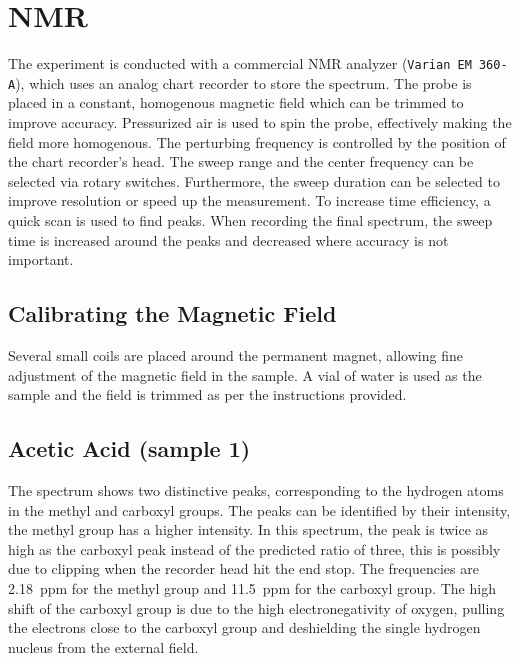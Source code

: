 \chapter{NMR}
The experiment is conducted with a commercial NMR analyzer (\texttt{Varian EM 360-A}), which uses an analog chart recorder to store the spectrum.
The probe is placed in a constant, homogenous magnetic field which can be trimmed to improve accuracy.
Pressurized air is used to spin the probe, effectively making the field more homogenous. %
The perturbing frequency is controlled by the position of the chart recorder's head.
The sweep range and the center frequency can be selected via rotary switches.
Furthermore, the sweep duration can be selected to improve resolution or speed up the measurement.
To increase time efficiency, a quick scan is used to find peaks.
When recording the final spectrum, the sweep time is increased around the peaks and decreased where accuracy is not important.

\section{Calibrating the Magnetic Field}
Several small coils are placed around the permanent magnet, allowing fine adjustment of the magnetic field in the sample.
A vial of water is used as the sample and the field is trimmed as per the instructions provided.


\section{Acetic Acid (sample 1)}
The spectrum shows two distinctive peaks, corresponding to the hydrogen atoms in the methyl and carboxyl groups.
The peaks can be identified by their intensity, the methyl group has a higher intensity.
In this spectrum, the peak is twice as high as the carboxyl peak instead of the predicted ratio of three, this is possibly due to clipping when the recorder head hit the end stop.
The frequencies are \SI{2.18}{ppm} for the methyl group and \SI{11.5}{ppm} for the carboxyl group.
The high shift of the carboxyl group is due to the high electronegativity of oxygen, pulling the electrons close to the carboxyl group and deshielding the single hydrogen nucleus from the external field.

